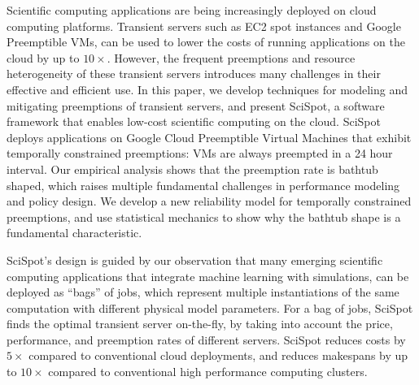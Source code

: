 Scientific computing applications are being increasingly deployed on cloud computing platforms.
Transient servers such as EC2 spot instances and Google Preemptible VMs, can be used to lower the costs of running applications on the cloud by up to $10\times$. 
However, the frequent preemptions and resource heterogeneity of these transient servers introduces many challenges in their effective and efficient use. 
In this paper, we develop techniques for modeling and mitigating preemptions of transient servers, and present SciSpot, a software framework that enables low-cost scientific computing on the cloud. 
SciSpot deploys applications on Google Cloud Preemptible Virtual Machines that exhibit temporally constrained preemptions: VMs are always preempted in a 24 hour interval. 
Our empirical analysis shows that the preemption rate is bathtub shaped, which raises multiple fundamental challenges in performance modeling and policy design. 
We develop a new reliability model for temporally constrained preemptions, and use statistical mechanics to show why the bathtub shape is a fundamental characteristic. 


SciSpot's design is guided by our observation that many emerging scientific computing applications that integrate machine learning with simulations, can be deployed as ``bags'' of jobs, which represent multiple instantiations of the same computation with different physical model parameters. 
For a bag of jobs, SciSpot finds the optimal transient server on-the-fly, by taking into account the price, performance, and preemption rates of different servers. 
SciSpot reduces costs by $5\times$ compared to conventional cloud deployments, and reduces  makespans by up to $10\times$ compared to conventional high performance computing clusters.


